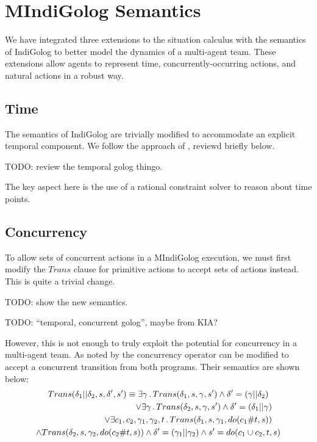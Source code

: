 \section{MIndiGolog Semantics\label{sec:MIndiGolog:Semantics}}

We have integrated three extensions to the situation calculus with
the semantics of IndiGolog to better model the dynamics of a multi-agent
team. These extensions allow agents to represent time, concurrently-occurring
actions, and natural actions in a robust way.


\subsection{Time}

The semantics of IndiGolog are trivially modified to accommodate an
explicit temporal component. We follow the approach of \citep{Reiter98seq_temp_golog},
reviewd briefly below.

TODO: review the temporal golog thingo.

The key aspect here is the use of a rational constraint solver to
reason about time points.


\subsection{Concurrency}

To allow sets of concurrent actions in a MIndiGolog execution, we
must first modify the $Trans$ clause for primitive actions to accept
sets of actions instead. This is quite a trivial change.

TODO: show the new semantics.

TODO: {}``temporal, concurrent golog'', maybe from KIA?

However, this is not enough to truly exploit the potential for concurrency
in a multi-agent team. As noted by \citep{pinto99tcongolog} the concurrency
operator can be modified to accept a concurrent transition from both
programs. Their semantics are shown below:\begin{multline*}
Trans(\delta_{1}||\delta_{2},s,\delta',s')\equiv\exists\gamma\,.\, Trans(\delta_{1},s,\gamma,s')\wedge\delta'=(\gamma||\delta_{2})\\
\shoveright{\vee\exists\gamma\,.\, Trans(\delta_{2},s,\gamma,s')\wedge\delta'=(\delta_{1}||\gamma)}\\
\shoveright{\vee\exists c_{1},c_{2},\gamma_{1},\gamma_{2},t\,.\, Trans(\delta_{1},s,\gamma_{1},do(c_{1}\#t,s))}\\
\wedge Trans(\delta_{2},s,\gamma_{2},do(c_{2}\#t,s))\wedge\delta'=(\gamma_{1}||\gamma_{2})\wedge s'=do(c_{1}\cup c_{2},t,s)\end{multline*}



